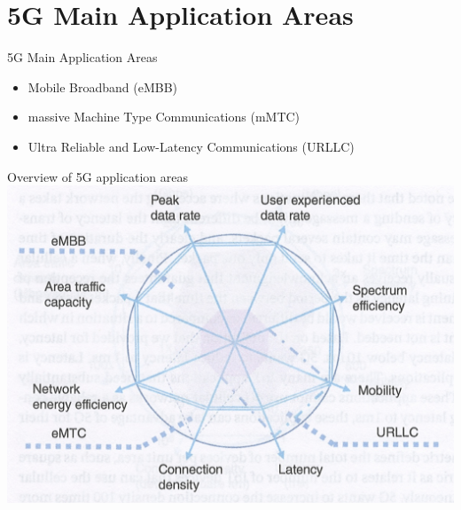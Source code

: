 \documentclass{beamer}
\begin{document}


\section[5G Main Application Areas]{5G Main Application Areas}

\begin{frame}{5G Main Application Areas}
  \vspace*{1.6em}
  \begin{itemize}
    \item Mobile Broadband (eMBB)
    \vspace*{0.75em}
    \item massive Machine Type Communications (mMTC)
    \vspace*{0.75em}
    \item Ultra Reliable and Low-Latency Communications (URLLC)
  \end{itemize}
\end{frame}

\begin{frame}{Overview of 5G application areas}
  \hspace*{0.6em}
  \includegraphics[scale=0.45]{fig/5g_application_areas.png}
\end{frame}
\end{document}
